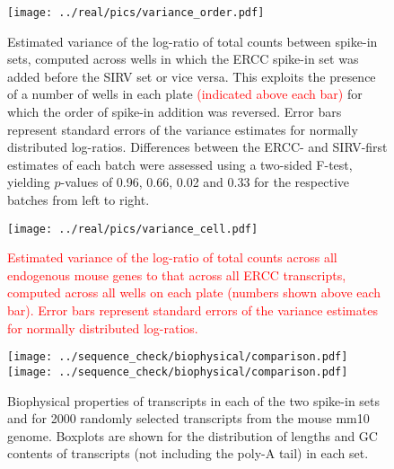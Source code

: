 \documentclass{article}
\newcommand\revised[1]{\textcolor{red}{#1}}
\begin{document}
\begin{figure}[btp]
    \begin{center}
        \texttt{[image: ../real/pics/variance\_order.pdf]}
    \end{center}
    \caption{Estimated variance of the log-ratio of total counts between spike-in sets, computed across wells in which the ERCC spike-in set was added before the SIRV set or vice versa.
        This exploits the presence of a number of wells in each plate \revised{(indicated above each bar)} for which the order of spike-in addition was reversed.
        Error bars represent standard errors of the variance estimates for normally distributed log-ratios.
        Differences between the ERCC- and SIRV-first estimates of each batch were assessed using a two-sided F-test, yielding $p$-values of 0.96, 0.66, 0.02 and 0.33 for the respective batches from left to right.
    }
\end{figure}

\begin{figure}[btp]
    \begin{center}
        \texttt{[image: ../real/pics/variance\_cell.pdf]}
    \end{center}
    \caption{\revised{Estimated variance of the log-ratio of total counts across all endogenous mouse genes to that across all ERCC transcripts, computed across all wells on each plate (numbers shown above each bar).
        Error bars represent standard errors of the variance estimates for normally distributed log-ratios.
        }
    }
\end{figure}

\begin{figure}[btp]
    \begin{center}
        \texttt{[image: ../sequence\_check/biophysical/comparison.pdf]}
        \texttt{[image: ../sequence\_check/biophysical/comparison.pdf]}
    \end{center}
    \caption{Biophysical properties of transcripts in each of the two spike-in sets and for 2000 randomly selected transcripts from the mouse mm10 genome.
    Boxplots are shown for the distribution of lengths and GC contents of transcripts (not including the poly-A tail) in each set.
}
\end{figure}
\end{document}
